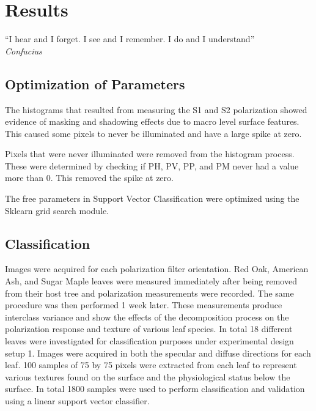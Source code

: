 \chapter{Results}
%
\begin{center}
  \begin{minipage}{0.75\textwidth}
    \begin{small}
      “I hear and I forget. I see and I remember. I do and I understand”\\
      \null\hfill\emph{Confucius}
    \end{small}
  \end{minipage}
  \vspace{0.5cm}
\end{center}
\section{Optimization of Parameters}
The histograms that resulted from measuring the S1 and S2 polarization showed evidence of masking and shadowing effects due to macro level surface features.  This caused some pixels to never be illuminated and have a large spike at zero.

Pixels that were never illuminated were removed from the histogram process. These were determined by checking if PH, PV, PP, and PM never had a value more than 0.  This removed the spike at zero.

The free parameters in Support Vector Classification were optimized using the Sklearn grid search module.

\section{Classification}
Images were acquired for each polarization filter orientation. Red Oak, American Ash, and Sugar Maple leaves were measured immediately after being removed from their host tree and polarization measurements were recorded.  The same procedure was then performed 1 week later.  These measurements produce interclass variance and show the effects of the decomposition process on the polarization response and texture of various leaf species.  In total 18 different leaves were investigated for classification purposes under experimental design setup 1.  Images were acquired in both the specular and diffuse directions for each leaf.  100 samples of 75 by 75 pixels were extracted from each leaf to represent various textures found on the surface and the physiological status below the surface.  In total 1800 samples were used to perform classification and validation using a linear support vector classifier.
